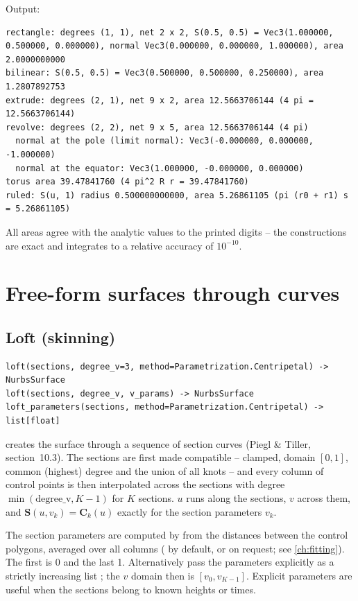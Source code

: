 
Output:

\begin{lstlisting}[style=text]
rectangle: degrees (1, 1), net 2 x 2, S(0.5, 0.5) = Vec3(1.000000, 0.500000, 0.000000), normal Vec3(0.000000, 0.000000, 1.000000), area 2.0000000000
bilinear: S(0.5, 0.5) = Vec3(0.500000, 0.500000, 0.250000), area 1.2807892753
extrude: degrees (2, 1), net 9 x 2, area 12.5663706144 (4 pi = 12.5663706144)
revolve: degrees (2, 2), net 9 x 5, area 12.5663706144 (4 pi)
  normal at the pole (limit normal): Vec3(-0.000000, 0.000000, -1.000000)
  normal at the equator: Vec3(1.000000, -0.000000, 0.000000)
torus area 39.47841760 (4 pi^2 R r = 39.47841760)
ruled: S(u, 1) radius 0.500000000000, area 5.26861105 (pi (r0 + r1) s = 5.26861105)
\end{lstlisting}

All areas agree with the analytic values to the printed digits -- the constructions are exact
and  integrates to a relative accuracy of $10^{-10}$.

\section{Free-form surfaces through curves}\label{sec:freeform-surfaces}

\subsection{Loft (skinning)}

\begin{lstlisting}[style=text]
loft(sections, degree_v=3, method=Parametrization.Centripetal) -> NurbsSurface
loft(sections, degree_v, v_params) -> NurbsSurface
loft_parameters(sections, method=Parametrization.Centripetal) -> list[float]
\end{lstlisting}

 creates the surface through a sequence of section curves (Piegl \& Tiller,
section~10.3). The sections are first made compatible -- clamped, domain $[0,1]$, common
(highest) degree and the union of all knots -- and every column of control points is then
interpolated across the sections with degree $\min(\text{degree\_v}, K-1)$ for $K$ sections.
$u$ runs along the sections, $v$ across them, and $\mathbf S(u, v_k) = \mathbf C_k(u)$ exactly
for the section parameters $v_k$.

The section parameters are computed by  from the distances between the
control polygons, averaged over all columns ( by default, 
or  on request; see \cref{ch:fitting}). The first is 0 and the last 1. Alternatively
pass the parameters explicitly as a strictly increasing list ; the $v$ domain
then is $[v_0, v_{K-1}]$. Explicit parameters are useful when the sections belong to known
heights or times.

